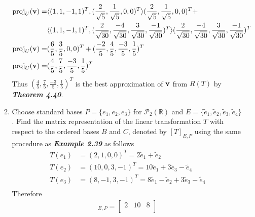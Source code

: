 \documentclass{uofa-eng-assignment}
\begin{document}
\begin{enumerate}
\begin{enumerate}
	      	      \begin{align*}
	      	      	\text{proj}_U(\vb{v}) = & \langle (1, 1, -1, 1)^T,  (\frac{2}{\sqrt{5}}, \frac{1}{\sqrt{5}},0 ,0)^T\rangle  (\frac{2}{\sqrt{5}}, \frac{1}{\sqrt{5}},0 ,0)^T +                                                                                 \\
	      	      	                        & \langle (1, 1, -1, 1)^T,  (\frac{2}{\sqrt{30}}, \frac{-4}{\sqrt{30}}, \frac{3}{\sqrt{30}}, \frac{-1}{\sqrt{30}})^T\rangle  (\frac{2}{\sqrt{30}}, \frac{-4}{\sqrt{30}}, \frac{3}{\sqrt{30}}, \frac{-1}{\sqrt{30}})^T \\
	      	      	\text{proj}_U(\vb{v}) = & (\frac{6}{5}, \frac{3}{5}, 0, 0)^T + (\frac{-2}{5}, \frac{4}{5}, \frac{-3}{5}, \frac{1}{5})^T                                                                                                                       \\
	      	      	\text{proj}_U(\vb{v}) = & (\frac{4}{5}, \frac{7}{5}, \frac{-3}{5}, \frac{1}{5})^T                                                                                                                                                             
	      	      \end{align*}
	      	      Thus $(\frac{4}{5}, \frac{7}{5}, \frac{-3}{5}, \frac{1}{5})^T$ is the best approximation of $\vb{v}$ from $R(T)$ by \textbf{\textit{Theorem 4.40}}.
	      	\item Choose standard bases $P = \{e_1, e_2, e_3 \}$ for $\mathcal{P}_2(\mathbb{R})$ and $E = \{\tilde{e}_1, \tilde{e}_2, \tilde{e}_3, \tilde{e}_4\}$. Find the matrix representation of the linear transformation $T$ with respect to the ordered bases $B$ and $C$, denoted by $[T]_{E, P}$ using the same procedure as \textbf{\textit{Example 2.39}} as follows
	      	      \begin{align*}
	      	      	T(e_1) & = (2, 1, 0, 0)^T = 2\tilde{e}_1 + \tilde{e}_2                                  \\
	      	      	T(e_2) & = (10, 0, 3, -1)^T = 10\tilde{e}_1 + 3\tilde{e}_3 - \tilde{e}_4                \\
	      	      	T(e_3) & = (8, -1, 3, -1)^T = 8\tilde{e}_1 - \tilde{e}_2 +  3\tilde{e}_3 -  \tilde{e}_4 \\
	      	      \end{align*}
	      	      Therefore
	      	      \begin{align*}
	      	      	[T]_{E, P} = \begin{bmatrix}
	      	      	2 & 10 & 8  \\

\end{bmatrix}
\end{align*}
\end{enumerate}
\end{enumerate}
\end{document}
